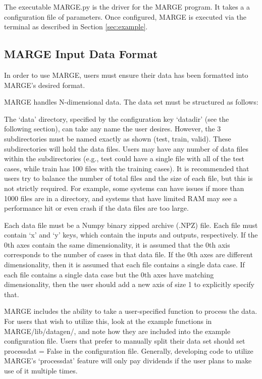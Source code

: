 \documentclass[letterpaper, 12pt]{article}
\begin{document}
The executable MARGE.py is the driver for the MARGE program. It takes a 
a configuration file of parameters.  Once configured, MARGE is executed via 
the terminal as described in Section \ref{sec:example}.


\subsection{MARGE Input Data Format}
In order to use MARGE, users must ensure their data has been formatted into 
MARGE's desired format.\newline

\noindent MARGE handles N-dimensional data.  The data set must be 
structured as follows:

\noindent{}
\vspace{0.7cm}

\noindent The `data' directory, specified by the configuration key `datadir'
(see the following section), can take any name the user desires.  However, 
the 3 subdirectories must be named exactly as shown (test, train, 
valid).  These subdirectories will hold the data files. Users may have any 
number of data files within the subdirectories (e.g., test could have a single 
file with all of the test cases, while train has 100 files with the training 
cases). It is recommended that users try to balance the number of total files 
and the size of each file, but this is not strictly required.  For example, some 
systems can have issues if more than 1000 files are in a directory, and 
systems that have limited RAM may see a performance hit or even crash if the 
data files are too large.  \newline

\noindent Each data file must be a Numpy binary zipped archive (.NPZ) file.  
Each file must contain `x' and `y' keys, which contain the inputs and outputs, 
respectively.  If the 0th axes contain the same dimensionality, it is assumed 
that the 0th axis corresponds to the number of cases in that data file.  If the 
0th axes are different dimensionality, then it is assumed that each file contains 
a single data case.  If each file contains a single data case but the 0th axes 
have matching dimensionality, then the user should add a new axis of size 1
to explicitly specify that.

\noindent MARGE includes the ability to take a user-specified function to 
process the data.  For users that wish to utilize this, look at the example 
functions in MARGE/lib/datagen/, and note how they are included into the 
example configuration file.  Users that prefer to manually split their 
data set should set processdat = False in the configuration file.  Generally, 
developing code to utilize MARGE's `processdat' feature will only pay dividends 
if the user plans to make use of it multiple times.
\end{document}
